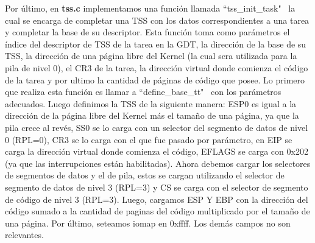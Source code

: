 \documentclass[a4paper]{article}
\begin{document}
Por último, en \textbf{tss.c} implementamos una función llamada ``tss_init_task" \, la cual se encarga de completar una TSS con los datos correspondientes a una tarea y completar la base de su descriptor. Esta función toma como parámetros el índice del descriptor de TSS de la tarea en la GDT, la dirección de la base de su TSS, la dirección de una página libre del Kernel (la cual sera utilizada para la pila de nivel $0$), el CR3 de la tarea, la dirección virtual donde comienza el código de la tarea y por ultimo la cantidad de páginas de código que posee.
\justify
Lo primero que realiza esta función es llamar a  ``define_base_tt" \ con los parámetros adecuados. Luego definimos la TSS de la siguiente manera: ESP0 es igual a la dirección de la página libre del Kernel más el tamaño de una página, ya que la pila crece al revés, SS0 se lo carga con un selector del segmento de datos de nivel 0 (RPL=0), CR3 se lo carga con el que fue pasado por parámetro, en EIP se carga la dirección virtual donde comienza el código, EFLAGS se carga con 0x202 (ya que las interrupciones están habilitadas). Ahora debemos cargar los selectores de segmentos de datos y el de pila, estos se cargan utilizando el selector de segmento de datos de nivel 3 (RPL=3) y CS se carga con el selector de segmento de código de nivel 3 (RPL=3). Luego,  cargamos ESP Y EBP con la dirección del código sumado a la cantidad de paginas del código multiplicado por el tamaño de una página. Por último, seteamos iomap en 0xffff. Los demás campos no son relevantes. 
\end{document}
